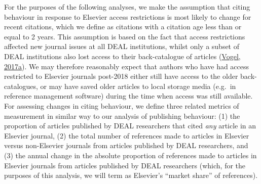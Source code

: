 \documentclass[
]{article}
\begin{document}
For the purposes of the following analyses, we make the assumption that citing behaviour in response to Elsevier access restrictions is most likely to change for recent citations, which we define as citations with a citation age less than or equal to 2 years. This assumption is based on the fact that access restrictions affected new journal issues at all DEAL institutions, whilst only a subset of DEAL institutions also lost access to their back-catalogue of articles (\href{https://doi.org/10.1126/science.355.6320.17}{Vogel, 2017a}). We may therefore reasonably expect that authors who have had access restricted to Elsevier journals post-2018 either still have access to the older back-catalogues, or may have saved older articles to local storage media (e.g.~in reference management software) during the time when access was still available. For assessing changes in citing behaviour, we define three related metrics of measurement in similar way to our analysis of publishing behaviour: (1) the proportion of articles published by DEAL researchers that cited \emph{any} article in an Elsevier journal, (2) the total number of references made to articles in Elsevier versus non-Elsevier journals from articles published by DEAL researchers, and (3) the annual change in the absolute proportion of references made to articles in Elsevier journals from articles published by DEAL researchers (which, for the purposes of this analysis, we will term as Elsevier's ``market share'' of references).
\end{document}
